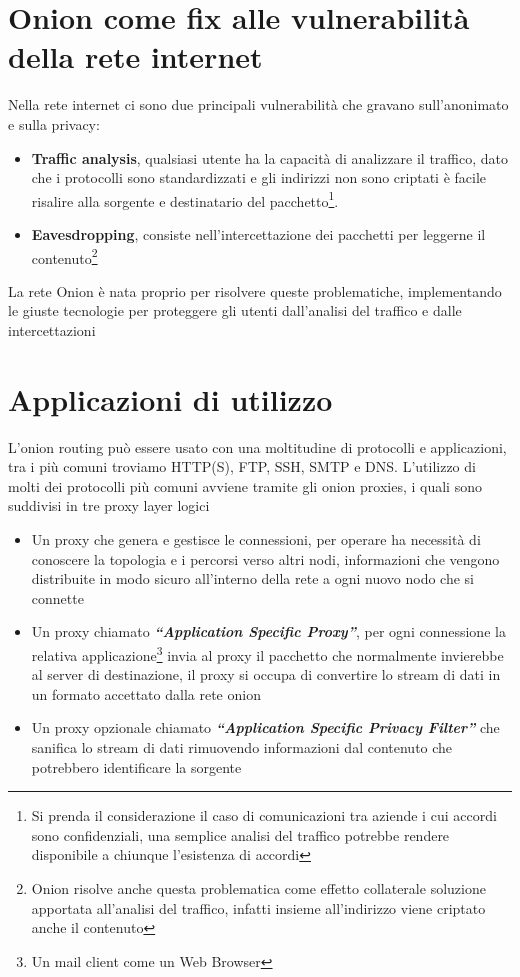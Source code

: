 \newpage

\section{Onion come fix alle vulnerabilità della rete internet}
Nella rete internet ci sono due principali vulnerabilità che gravano sull'anonimato e sulla privacy:
\begin{itemize}
    \item \textbf{Traffic analysis}, qualsiasi utente ha la capacità di analizzare il traffico, dato che i protocolli sono standardizzati e gli indirizzi non sono criptati è facile risalire alla sorgente e destinatario del pacchetto\footnote{Si prenda il considerazione il caso di comunicazioni tra aziende i cui accordi sono confidenziali, una semplice analisi del traffico potrebbe rendere disponibile a chiunque l'esistenza di accordi}.
    \item \textbf{Eavesdropping}, consiste nell'intercettazione dei pacchetti per leggerne il contenuto\footnote{Onion risolve anche questa problematica come effetto collaterale soluzione apportata all'analisi del traffico, infatti insieme all'indirizzo viene criptato anche il contenuto}
\end{itemize}
La rete Onion è nata proprio per risolvere queste problematiche, implementando le giuste tecnologie per proteggere gli utenti dall'analisi del traffico e dalle intercettazioni
\cite{AnonymousConnections}

\section{Applicazioni di utilizzo}
L'onion routing può essere usato con una moltitudine di protocolli e applicazioni, tra i più comuni troviamo HTTP(S), FTP, SSH, SMTP e DNS. 
L'utilizzo di molti dei protocolli più comuni avviene tramite gli onion proxies, i quali sono suddivisi in tre proxy layer logici
\begin{itemize}
    \item Un proxy che genera e gestisce le connessioni, per operare ha necessità di conoscere la topologia e i percorsi verso altri nodi, informazioni che vengono distribuite in modo sicuro all'interno della rete a ogni nuovo nodo che si connette 
    \item Un proxy chiamato \emph{\textbf{“Application Specific Proxy”}}, per ogni connessione la relativa applicazione\footnote{Un mail client come un Web Browser} invia al proxy il pacchetto che normalmente invierebbe al server di destinazione, il proxy si occupa di convertire lo stream di dati in un formato accettato dalla rete onion
    \item Un proxy opzionale chiamato \emph{\textbf{“Application Specific Privacy Filter”}} che sanifica lo stream di dati rimuovendo informazioni dal contenuto che potrebbero identificare la sorgente
\end{itemize}

